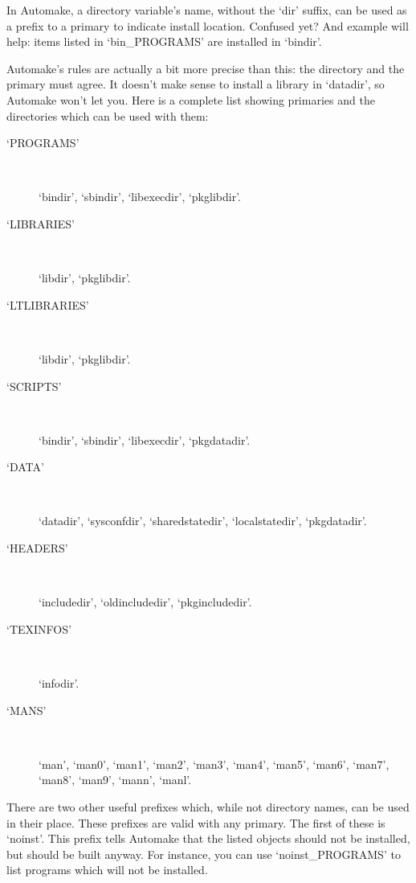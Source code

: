 In Automake, a directory variable's name, without the `dir' suffix, can be used as a prefix to a primary to indicate install location. Confused yet? And example will help: items listed in `bin\_{}PROGRAMS' are installed in `bindir'.

Automake's rules are actually a bit more precise than this: the directory and the primary must agree. It doesn't make sense to install a library in `datadir', so Automake won't let you. Here is a complete list showing primaries and the directories which can be used with them: 

\begin{description}
\item[`PROGRAMS']
\

    `bindir', `sbindir', `libexecdir', `pkglibdir'.

\item[`LIBRARIES']
\

    `libdir', `pkglibdir'.

\item[`LTLIBRARIES']
\

    `libdir', `pkglibdir'.

\item[`SCRIPTS']
\

    `bindir', `sbindir', `libexecdir', `pkgdatadir'.

\item[`DATA']
\

    `datadir', `sysconfdir', `sharedstatedir', `localstatedir', `pkgdatadir'.

\item[`HEADERS']
\

    `includedir', `oldincludedir', `pkgincludedir'.

\item[`TEXINFOS']
\

    `infodir'.

\item[`MANS']
\

    `man', `man0', `man1', `man2', `man3', `man4', `man5', `man6', `man7', `man8', `man9', `mann', `manl'.
\end{description}

There are two other useful prefixes which, while not directory names, can be used in their place. These prefixes are valid with any primary. The first of these is `noinst'. This prefix tells Automake that the listed objects should not be installed, but should be built anyway. For instance, you can use `noinst\_{}PROGRAMS' to list programs which will not be installed.

